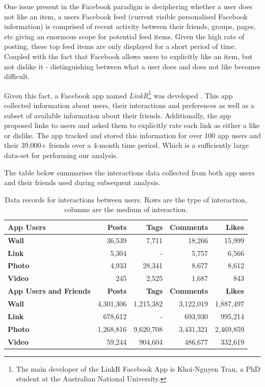 One issue present in the Facebook paradigm is deciphering whether a user does not like an item, a users Facebook feed (current visible 
personalised Facebook information) is comprised of recent
activity  between their friends, groups, pages, etc giving an enormous scope for potential feed items.
Given the high rate of posting, these top feed items are only displayed for a short period of time. Coupled 
with the fact that Facebook allows users to explicitly like an item, but not dislike it - distinguishing between what 
a user does and does not like becomes difficult.


Given this fact, a Facebook app named \emph{LinkR}\footnote{The main developer of the LinkR Facebook App is Khoi-Nguyen Tran, a PhD student at the Australian National University.} was developed \cite{www}.
This app collected information about users, their interactions and preferences as well as a subset of available information about 
their friends. Additionally, the app proposed links to users and asked them to explicitly rate each link as either a like or dislike. 
The app tracked and stored this information for over 100 app users and their 39,000+ friends over a 4-month time period. Which is a sufficiently large data-set for 
performing our analysis.

The table below summarises the interactions data collected from both app users and their friends used during subsequent analysis.

\begin{table}[tbh!]
\centering
	\begin{tabular}{|l|r|r|r|r|} %
		\hline
		\textbf{App Users} & \textbf{Posts} & \textbf{Tags} & \textbf{Comments} & \textbf{Likes}  \\ \hline
		\textbf{Wall} & 36,539 & 7,711 & 18,266 & 15,999 \\ \hline
		\textbf{Link} & 5,304 & - & 5,757 & 6,566 \\ \hline
		\textbf{Photo} & 4,933 & 28,341 & 8,677 & 8,612 \\ \hline
		\textbf{Video} & 245 & 2,525 & 1,687 & 843 \\ \hline
		 \hline
		\textbf{App Users and Friends} & \textbf{Posts} & \textbf{Tags} & \textbf{Comments} & \textbf{Likes}  \\ \hline
		\textbf{Wall} & 4,301,306 & 1,215,382 & 3,122,019 & 1,887,497 \\ \hline
		\textbf{Link} & 678,612 & - & 693,930 & 995,214 \\ \hline
		\textbf{Photo} & 1,268,816 & 9,620,708 & 3,431,321 & 2,469,859 \\ \hline
		\textbf{Video} & 59,244 & 904,604 & 486,677 & 332,619 \\ \hline
	\end{tabular}
	\caption{Data records for interactions between users. Rows are the type of interaction, columns are the medium of interaction.}
	\label{tab:revpol}
\end{table}

